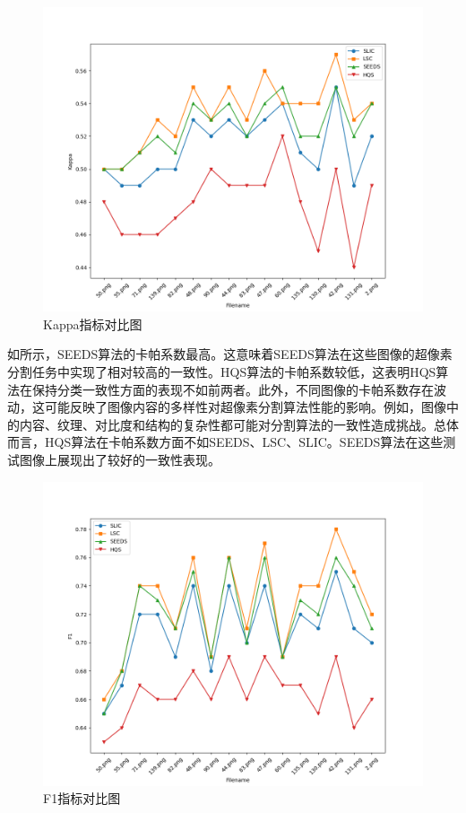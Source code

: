 \begin{figure}[htbp]
	\centering
	\includegraphics[width=1\textwidth]{pic/Kappa.png}
	\caption{Kappa指标对比图}
    \label{fig:kappa}
\end{figure}

如所示，SEEDS算法的卡帕系数最高。这意味着SEEDS算法在这些图像的超像素分割任务中实现了相对较高的一致性。HQS算法的卡帕系数较低，这表明HQS算法在保持分类一致性方面的表现不如前两者。此外，不同图像的卡帕系数存在波动，这可能反映了图像内容的多样性对超像素分割算法性能的影响。例如，图像中的内容、纹理、对比度和结构的复杂性都可能对分割算法的一致性造成挑战。总体而言，HQS算法在卡帕系数方面不如SEEDS、LSC、SLIC。SEEDS算法在这些测试图像上展现出了较好的一致性表现。

\begin{figure}[htbp]
	\centering
	\includegraphics[width=1\textwidth]{pic/F1.png}
	\caption{F1指标对比图}
    \label{fig:F1}
\end{figure}

